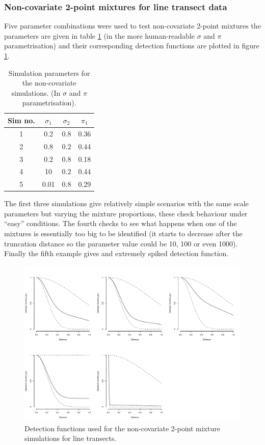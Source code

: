 \subsubsection{Non-covariate 2-point mixtures for line transect data}

Five parameter combinations were used to test non-covariate 2-point mixtures the parameters are given in table \ref{mmds-nocov-simtable} (in the more human-readable $\sigma$ and $\pi$ parametrisation) and their corresponding detection functions are plotted in figure \ref{mmds-nocov-funcs}.

\begin{table}[ht]
\centering
\begin{tabular}{c c c c}
Sim no. & $\sigma_1$ & $\sigma_2$ & $\pi_1$\\
\hline
\hline
1 & 0.2 & 0.8 &  0.36\\
2 & 0.8 & 0.2 & 0.44\\
3 & 0.2 & 0.8 & 0.18\\
4 & 10  & 0.2 & 0.44\\
5 & 0.01&  0.8 & 0.29\\
\end{tabular}
\label{mmds-nocov-simtable}
\caption{Simulation parameters for the non-covariate simulations. (In $\sigma$ and $\pi$ parametrisation).}
\end{table}

The first three simulations give relatively simple scenarios with the same scale parameters but varying the mixture proportions, these check behaviour under ``easy'' conditions. The fourth checks to see what happens when one of the mixtures is essentially too big to be identified (it starts to decrease after the truncation distance so the parameter value could be 10, 100 or even 1000). Finally the fifth example gives and extremely spiked detection function.

\begin{figure}
\centering
\includegraphics[width=6in]{mix/figs/nocov-detfcts.pdf}
\caption{Detection functions used for the non-covariate 2-point mixture simulations for line transects.}
\label{mmds-nocov-funcs}
\end{figure}

